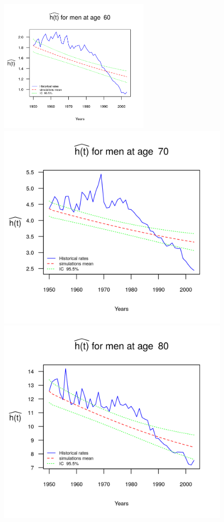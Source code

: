 \documentclass[smallextended]{svjour3}
\begin{document}
\begin{figure}[H]
    \includegraphics[width = 2.85in]{PlotMen60.png}
    \includegraphics{PlotMen70.png}
    \includegraphics{PlotMen80.png}

\end{figure}
\end{document}
